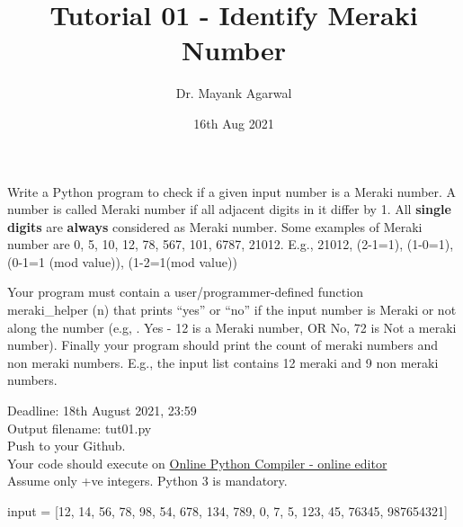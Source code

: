 \documentclass[12pt,  letterpaper,  twoside]{article}
\title{Tutorial 01 - Identify Meraki Number}
\author{Dr. Mayank Agarwal}
\date{16th Aug 2021}
\begin{document}
	\maketitle  
	
	
	Write a Python program to check if a given input number is a Meraki number. A number is called Meraki number if all adjacent digits in it differ by 1. All \textbf{single digits }are \textbf{always }considered as Meraki number. Some examples of Meraki number are 0,  5,  10,  12,  78,  567,  101,  6787,  21012.  E.g.,  21012,  (2-1=1),  (1-0=1),  (0-1=1 (mod value)),  (1-2=1(mod value))
	
	
	 Your program must contain a user/programmer-defined function \\  meraki\_helper (n) that prints “yes” or “no” if the input number is Meraki or not along the number (e.g, . Yes - 12 is a Meraki number,  OR No,  72 is Not a meraki number). Finally your program should print the count of meraki numbers and non meraki numbers. E.g., the input list contains 12 meraki and 9 non meraki numbers.
	 
	 Deadline: 18th August 2021,  23:59 \\
	 Output filename: tut01.py \\
	 Push to your Github. \\
	 Your code should execute on
	 \href{https://www.onlinegdb.com/online_python_compiler}{Online Python Compiler - online editor} \\
	 Assume only +ve integers. Python 3 is mandatory.
	 
	 input = [12,  14, 56, 78, 98, 54, 678, 134, 789, 0, 7, 5,  123,  45, 76345,  987654321]
	
\end{document}
